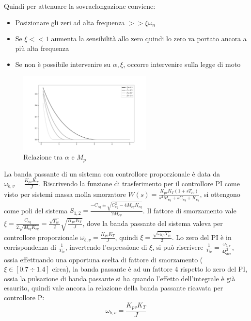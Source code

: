 Quindi per attenuare la sovraelongazione conviene:
\begin{itemize}
    \item Posizionare gli zeri ad alta frequenza \(>> \xi \omega_n\)
    \item Se \(\xi << 1\) aumenta la sensibilità allo zero quindi lo zero va portato ancora  a più alta frequenza
    \item Se non è possibile intervenire su \(\alpha, \xi\), occorre intervenire sulla legge di moto
\end{itemize}

\begin{figure}[h]
    \centering
    \includegraphics[width=0.6\textwidth]{Immagini/relazione_sovraelongazione.png}
    \caption{Relazione tra \(\alpha\) e \(M_p\)}
\end{figure}

La banda passante di un sistema con controllore proporzionale è data da \(\omega_{b,v}=\frac{K_{pv}K_T}{J}\).
Riscrivendo la funzione di trasferimento per il controllore PI come visto per sistemi massa molla smorzatore \(W(s)=\frac{K_{pv}K_T(1+sT_{iv})}{s^2M_{eq} + s C_{eq} + K_{eq}}\), si ottengono come poli del sistema \(S_{1,2}=\frac{-C_{eq}\pm\sqrt{C_{eq}^2-4M_{eq}K_{eq}}}{2M_{eq}}\). Il fattore di smorzamento vale \(\xi = \frac{C_{eq}}{2\sqrt{M_{eq}K_{eq}}}=\frac{\sqrt{T_{iv}}}{2}\sqrt{\frac{K_{pv}K_T}{J}}\), dove la banda passante del sistema valeva per controllore proporzionale \(\omega_{b,v}=\frac{K_{pv}K_T}{J}\), quindi \(\xi=\frac{\sqrt{\omega_{b,v}T_{iv}}}{2}\).
Lo zero del PI è in corrispondenza di \(\frac{1}{T_{iv}}\), invertendo l'espressione di \(\xi\), si può riscrivere \(\frac{1}{T_{iv}} = \frac{\omega_{b,v}}{4\xi^2_{des}}\), ossia effettuando una opportuna scelta di fattore di smorzamento (\(\xi \in [0.7\div 1.4]\)  circa), la banda passante è ad un fattore 4 rispetto lo zero del PI, ossia la pulsazione di banda passante si ha quando l'effetto dell'integrale è già esaurito, quindi vale ancora la relazione della banda passante ricavata per controllore P:
\[\omega_{b,v}=\frac{K_{pv}K_T}{J}\]

